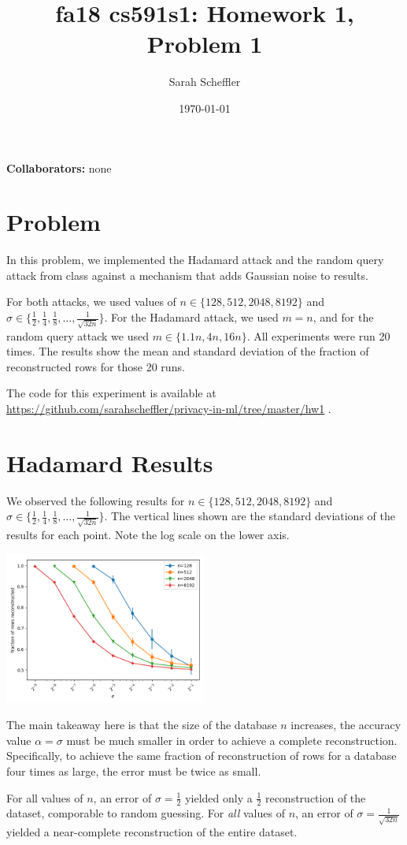\documentclass{article}
\title{fa18 cs591s1: Homework 1, Problem 1}
\author{Sarah Scheffler}
\date{\today}
\begin{document}
\maketitle
\textbf{Collaborators: } none

\section{Problem}

In this problem, we implemented the Hadamard attack and the random query attack from class against a mechanism that
adds Gaussian noise to results.

For both attacks, we used values of $n \in \{128, 512, 2048, 8192\}$ and $\sigma \in \{\frac12, \frac14, \frac18,
\ldots, \frac{1}{\sqrt{32n}}\}$.  For the Hadamard attack, we used $m=n$, and for the random query attack we used $m
\in \{1.1n, 4n, 16n\}$.  All experiments were run 20 times.  The results show the mean and standard deviation of the
fraction of reconstructed rows for those 20 runs.

The code for this experiment is available at \href{https://github.com/sarahscheffler/privacy-in-ml/tree/master/hw1}{https://github.com/sarahscheffler/privacy-in-ml/tree/master/hw1} .

\section{Hadamard Results}

We observed the following results for $n \in \{128, 512, 2048, 8192\}$ and $\sigma \in \{\frac12, \frac14, \frac18,
\ldots, \frac{1}{\sqrt{32n}}\}$.  The vertical lines shown are the standard deviations of the results for each point.
Note the log scale on the lower axis.

\begin{center}
    \includegraphics[width=0.5\textwidth]{hadamard_graph.png}
\end{center}

The main takeaway here is that the size of the database $n$ increases, the accuracy value $\alpha=\sigma$ must be much
smaller in order to achieve a complete reconstruction.  Specifically, to achieve the same fraction of reconstruction of
rows for a database four times as large, the error must be twice as small.

For all values of $n$, an error of $\sigma=\frac12$ yielded only a $\frac12$ reconstruction of the dataset, comporable
to random guessing.  For \emph{all} values of $n$, an error of $\sigma=\frac{1}{\sqrt{32n}}$ yielded a near-complete reconstruction
of the entire dataset.
\end{document}
